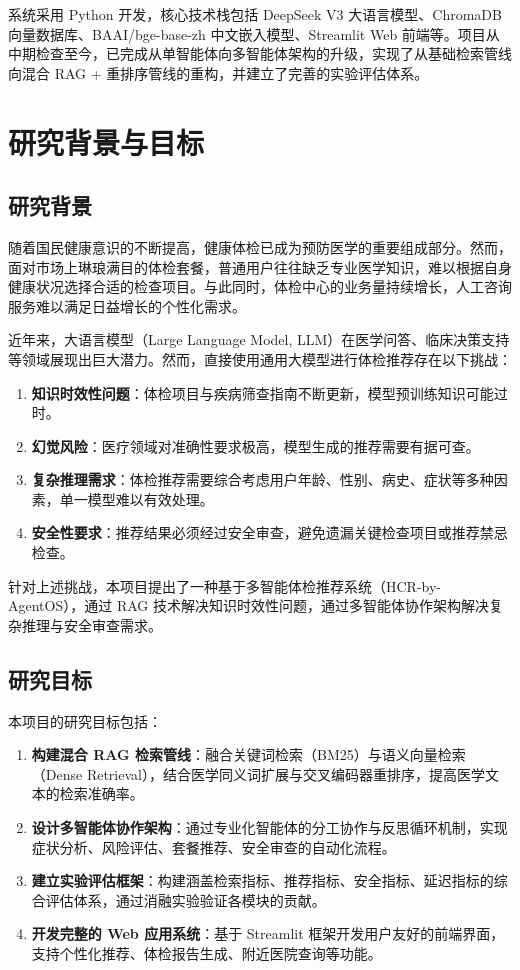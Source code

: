 \documentclass[12pt,a4paper]{article}
\begin{document}
系统采用 Python 开发，核心技术栈包括 DeepSeek V3 大语言模型、ChromaDB 向量数据库、BAAI/bge-base-zh 中文嵌入模型、Streamlit Web 前端等。项目从中期检查至今，已完成从单智能体向多智能体架构的升级，实现了从基础检索管线向混合 RAG + 重排序管线的重构，并建立了完善的实验评估体系。

\section{研究背景与目标}
\label{sec:background}

\subsection{研究背景}

随着国民健康意识的不断提高，健康体检已成为预防医学的重要组成部分。然而，面对市场上琳琅满目的体检套餐，普通用户往往缺乏专业医学知识，难以根据自身健康状况选择合适的检查项目。与此同时，体检中心的业务量持续增长，人工咨询服务难以满足日益增长的个性化需求。

近年来，大语言模型（Large Language Model, LLM）在医学问答、临床决策支持等领域展现出巨大潜力。然而，直接使用通用大模型进行体检推荐存在以下挑战：

\begin{enumerate}[leftmargin=2em]
    \item \textbf{知识时效性问题}：体检项目与疾病筛查指南不断更新，模型预训练知识可能过时。
    \item \textbf{幻觉风险}：医疗领域对准确性要求极高，模型生成的推荐需要有据可查。
    \item \textbf{复杂推理需求}：体检推荐需要综合考虑用户年龄、性别、病史、症状等多种因素，单一模型难以有效处理。
    \item \textbf{安全性要求}：推荐结果必须经过安全审查，避免遗漏关键检查项目或推荐禁忌检查。
\end{enumerate}

针对上述挑战，本项目提出了一种基于多智能体检推荐系统（HCR-by-AgentOS），通过 RAG 技术解决知识时效性问题，通过多智能体协作架构解决复杂推理与安全审查需求。

\subsection{研究目标}

本项目的研究目标包括：

\begin{enumerate}[leftmargin=2em]
    \item \textbf{构建混合 RAG 检索管线}：融合关键词检索（BM25）与语义向量检索（Dense Retrieval），结合医学同义词扩展与交叉编码器重排序，提高医学文本的检索准确率。
    \item \textbf{设计多智能体协作架构}：通过专业化智能体的分工协作与反思循环机制，实现症状分析、风险评估、套餐推荐、安全审查的自动化流程。
    \item \textbf{建立实验评估框架}：构建涵盖检索指标、推荐指标、安全指标、延迟指标的综合评估体系，通过消融实验验证各模块的贡献。
    \item \textbf{开发完整的 Web 应用系统}：基于 Streamlit 框架开发用户友好的前端界面，支持个性化推荐、体检报告生成、附近医院查询等功能。
\end{enumerate}
\end{document}
